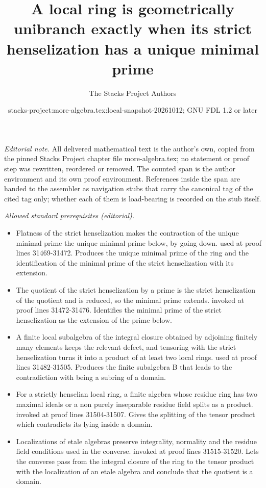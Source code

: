 \documentclass[10pt,a4paper]{amsart}
\title{A local ring is geometrically unibranch exactly when its strict henselization has a unique minimal prime}
\author{The Stacks Project Authors}
\date{stacks-project:more-algebra.tex:local-snapshot-20261012; GNU FDL 1.2 or later}
\theoremstyle{plain}
\theoremstyle{definition}
\theoremstyle{remark}
\numberwithin{equation}{subsection}
\begin{document}
\maketitle
\setcounter{subsection}{1}
\noindent\textit{Editorial note.} All delivered mathematical text is the author's own, copied from the pinned Stacks Project chapter file more-algebra.tex; no statement or proof step was rewritten, reordered or removed. The counted span is the author environment and its own proof environment. References inside the span are handed to the assembler as navigation stubs that carry the canonical tag of the cited tag only; whether each of them is load-bearing is recorded on the stub itself.\par\medskip
\noindent\textit{Allowed standard prerequisites (editorial).}\begin{itemize}
\item Flatness of the strict henselization makes the contraction of the unique minimal prime the unique minimal prime below, by going down. used at proof lines 31469-31472. Produces the unique minimal prime of the ring and the identification of the minimal prime of the strict henselization with its extension.
\item The quotient of the strict henselization by a prime is the strict henselization of the quotient and is reduced, so the minimal prime extends. invoked at proof lines 31472-31476. Identifies the minimal prime of the strict henselization as the extension of the prime below.
\item A finite local subalgebra of the integral closure obtained by adjoining finitely many elements keeps the relevant defect, and tensoring with the strict henselization turns it into a product of at least two local rings. used at proof lines 31482-31505. Produces the finite subalgebra B that leads to the contradiction with being a subring of a domain.
\item For a strictly henselian local ring, a finite algebra whose residue ring has two maximal ideals or a non purely inseparable residue field splits as a product. invoked at proof lines 31504-31507. Gives the splitting of the tensor product which contradicts its lying inside a domain.
\item Localizations of etale algebras preserve integrality, normality and the residue field conditions used in the converse. invoked at proof lines 31515-31520. Lets the converse pass from the integral closure of the ring to the tensor product with the localization of an etale algebra and conclude that the quotient is a domain.
\end{itemize}\medskip
\end{document}
